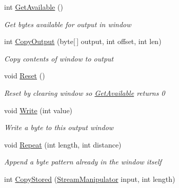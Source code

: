\begin{DoxyCompactItemize}
int \hyperlink{class_i_c_sharp_code_1_1_sharp_zip_lib_1_1_zip_1_1_compression_1_1_streams_1_1_output_window_a1ae7b10eae496ec980847ad1b89fa689}{Get\+Available} ()
\begin{DoxyCompactList}\small\item\em Get bytes available for output in window \end{DoxyCompactList}\item 
int \hyperlink{class_i_c_sharp_code_1_1_sharp_zip_lib_1_1_zip_1_1_compression_1_1_streams_1_1_output_window_a2ed1c8e829e63d30e72ddbd18cbc75dc}{Copy\+Output} (byte\mbox{[}$\,$\mbox{]} output, int offset, int len)
\begin{DoxyCompactList}\small\item\em Copy contents of window to output \end{DoxyCompactList}\item 
void \hyperlink{class_i_c_sharp_code_1_1_sharp_zip_lib_1_1_zip_1_1_compression_1_1_streams_1_1_output_window_af69f36602755df59247e2b16b77b0cd5}{Reset} ()
\begin{DoxyCompactList}\small\item\em Reset by clearing window so \hyperlink{class_i_c_sharp_code_1_1_sharp_zip_lib_1_1_zip_1_1_compression_1_1_streams_1_1_output_window_a1ae7b10eae496ec980847ad1b89fa689}{Get\+Available} returns 0 \end{DoxyCompactList}\item 
void \hyperlink{class_i_c_sharp_code_1_1_sharp_zip_lib_1_1_zip_1_1_compression_1_1_streams_1_1_output_window_a907667959a906512f4e133765f58f5f6}{Write} (int value)
\begin{DoxyCompactList}\small\item\em Write a byte to this output window \end{DoxyCompactList}\item 
void \hyperlink{class_i_c_sharp_code_1_1_sharp_zip_lib_1_1_zip_1_1_compression_1_1_streams_1_1_output_window_a178618bcf366724847f54fd89d354387}{Repeat} (int length, int distance)
\begin{DoxyCompactList}\small\item\em Append a byte pattern already in the window itself \end{DoxyCompactList}\item 
int \hyperlink{class_i_c_sharp_code_1_1_sharp_zip_lib_1_1_zip_1_1_compression_1_1_streams_1_1_output_window_a2d2ae06a42c52d98946f46db44d565f0}{Copy\+Stored} (\hyperlink{class_i_c_sharp_code_1_1_sharp_zip_lib_1_1_zip_1_1_compression_1_1_streams_1_1_stream_manipulator}{Stream\+Manipulator} input, int length)

\end{DoxyCompactItemize}

